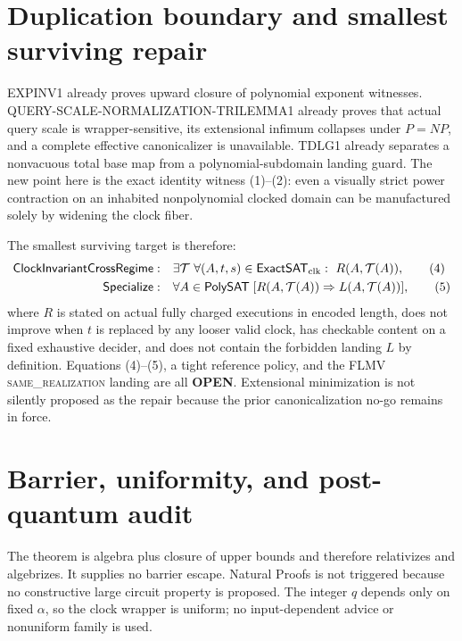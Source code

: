 \documentclass[11pt]{article}
\newcommand{\ExactSAT}{\mathsf{ExactSAT}_{\rm clk}}
\newcommand{\OPEN}{\textbf{OPEN}}
\newcommand{\same}{\textsc{same\_realization}}
\begin{document}
\section{Duplication boundary and smallest surviving repair}

EXPINV1 already proves upward closure of polynomial exponent witnesses.
QUERY-SCALE-NORMALIZATION-TRILEMMA1 already proves that actual query scale is
wrapper-sensitive, its extensional infimum collapses under $P=NP$, and a
complete effective canonicalizer is unavailable.  TDLG1 already separates a
nonvacuous total base map from a polynomial-subdomain landing guard.  The new
point here is the exact identity witness (1)--(2): even a visually strict
power contraction on an inhabited nonpolynomial clocked domain can be
manufactured solely by widening the clock fiber.

The smallest surviving target is therefore:
\begin{align*}
\textsf{ClockInvariantCrossRegime}:\quad &
 \exists\mathcal T\ \forall (A,t,s)\in\ExactSAT:\
 R(A,\mathcal T(A)) , \tag{4}\\
\textsf{Specialize}:\quad &
 \forall A\in\mathsf{PolySAT}\;[R(A,\mathcal T(A))\Rightarrow
 L(A,\mathcal T(A))], \tag{5}
\end{align*}
where $R$ is stated on actual fully charged executions in encoded length,
does not improve when $t$ is replaced by any looser valid clock, has
checkable content on a fixed exhaustive decider, and does not contain the
forbidden landing $L$ by definition.  Equations (4)--(5), a tight reference
policy, and the FLMV \same{} landing are all \OPEN.  Extensional minimization
is not silently proposed as the repair because the prior canonicalization
no-go remains in force.

\section{Barrier, uniformity, and post-quantum audit}

The theorem is algebra plus closure of upper bounds and therefore
relativizes and algebrizes.  It supplies no barrier escape.  Natural Proofs
is not triggered because no constructive large circuit property is proposed.
The integer $q$ depends only on fixed $\alpha$, so the clock wrapper is
uniform; no input-dependent advice or nonuniform family is used.
\end{document}
